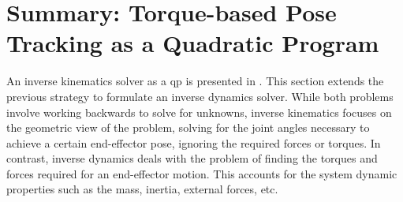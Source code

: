 \chapter{Summary: Torque-based Pose Tracking as a Quadratic Program}
\label{sec:id_solver}

An inverse kinematics solver as a \gls{qp} is presented in
. This section extends the previous strategy to
formulate an inverse dynamics solver. While both problems involve working
backwards to solve for unknowns, inverse kinematics focuses on the geometric
view of the problem, solving for the joint angles necessary to achieve a certain
end-effector pose, ignoring the required forces or torques. In contrast, inverse
dynamics deals with the problem of finding the torques and forces required for
an end-effector motion. This accounts for the system dynamic properties such as
the mass, inertia, external forces, etc.



